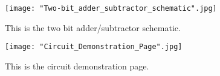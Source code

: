 \documentclass[11pt]{article}
\begin{document}
\begin{figure}[ht]\centering
	\texttt{[image: "Two-bit\_adder\_subtractor\_schematic".jpg]}
	\caption{This is the two bit adder/subtractor schematic.}
	\label{fig:half_adder}			%
\end{figure}

\begin{figure}[ht]\centering
	\texttt{[image: "Circuit\_Demonstration\_Page".jpg]}
	\caption{This is the circuit demonstration page.}
	\label{fig:full_adder}			%
\end{figure}
\end{document}
